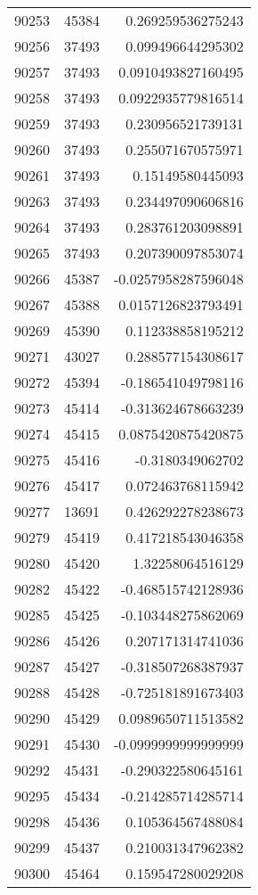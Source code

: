 \begin{tabular}{r | r | r}
90253 & 45384 & 0.269259536275243 \\
90256 & 37493 & 0.099496644295302 \\
90257 & 37493 & 0.0910493827160495 \\
90258 & 37493 & 0.0922935779816514 \\
90259 & 37493 & 0.230956521739131 \\
90260 & 37493 & 0.255071670575971 \\
90261 & 37493 & 0.15149580445093 \\
90263 & 37493 & 0.234497090606816 \\
90264 & 37493 & 0.283761203098891 \\
90265 & 37493 & 0.207390097853074 \\
90266 & 45387 & -0.0257958287596048 \\
90267 & 45388 & 0.0157126823793491 \\
90269 & 45390 & 0.112338858195212 \\
90271 & 43027 & 0.288577154308617 \\
90272 & 45394 & -0.186541049798116 \\
90273 & 45414 & -0.313624678663239 \\
90274 & 45415 & 0.0875420875420875 \\
90275 & 45416 & -0.3180349062702 \\
90276 & 45417 & 0.072463768115942 \\
90277 & 13691 & 0.426292278238673 \\
90279 & 45419 & 0.417218543046358 \\
90280 & 45420 & 1.32258064516129 \\
90282 & 45422 & -0.468515742128936 \\
90285 & 45425 & -0.103448275862069 \\
90286 & 45426 & 0.207171314741036 \\
90287 & 45427 & -0.318507268387937 \\
90288 & 45428 & -0.725181891673403 \\
90290 & 45429 & 0.0989650711513582 \\
90291 & 45430 & -0.0999999999999999 \\
90292 & 45431 & -0.290322580645161 \\
90295 & 45434 & -0.214285714285714 \\
90298 & 45436 & 0.105364567488084 \\
90299 & 45437 & 0.210031347962382 \\
90300 & 45464 & 0.159547280029208 \\

\end{tabular}
